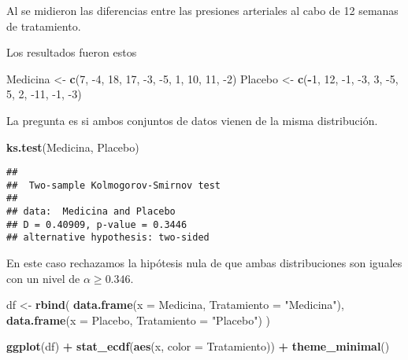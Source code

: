 \documentclass[
  12pt,
]{book}
\newenvironment{Shaded}{\begin{snugshade}}{\end{snugshade}}
\newcommand{\DataTypeTok}[1]{\textcolor[rgb]{0.13,0.29,0.53}{#1}}
\newcommand{\DecValTok}[1]{\textcolor[rgb]{0.00,0.00,0.81}{#1}}
\newcommand{\KeywordTok}[1]{\textcolor[rgb]{0.13,0.29,0.53}{\textbf{#1}}}
\newcommand{\NormalTok}[1]{#1}
\newcommand{\OperatorTok}[1]{\textcolor[rgb]{0.81,0.36,0.00}{\textbf{#1}}}
\newcommand{\StringTok}[1]{\textcolor[rgb]{0.31,0.60,0.02}{#1}}
\begin{document}
Al se midieron las diferencias entre las presiones arteriales al cabo de 12
semanas de tratamiento.

Los resultados fueron estos

\begin{Shaded}
\begin{Highlighting}[]
\NormalTok{Medicina \textless{}{-}}\StringTok{ }\KeywordTok{c}\NormalTok{(}\DecValTok{7}\NormalTok{, }\DecValTok{{-}4}\NormalTok{, }\DecValTok{18}\NormalTok{, }\DecValTok{17}\NormalTok{, }\DecValTok{{-}3}\NormalTok{, }\DecValTok{{-}5}\NormalTok{, }\DecValTok{1}\NormalTok{, }\DecValTok{10}\NormalTok{, }\DecValTok{11}\NormalTok{, }\DecValTok{{-}2}\NormalTok{)}
\NormalTok{Placebo \textless{}{-}}\StringTok{ }\KeywordTok{c}\NormalTok{(}\OperatorTok{{-}}\DecValTok{1}\NormalTok{, }\DecValTok{12}\NormalTok{, }\DecValTok{{-}1}\NormalTok{, }\DecValTok{{-}3}\NormalTok{, }\DecValTok{3}\NormalTok{, }\DecValTok{{-}5}\NormalTok{, }\DecValTok{5}\NormalTok{, }\DecValTok{2}\NormalTok{, }\DecValTok{{-}11}\NormalTok{, }\DecValTok{{-}1}\NormalTok{, }\DecValTok{{-}3}\NormalTok{)}
\end{Highlighting}
\end{Shaded}

La pregunta es si ambos conjuntos de datos vienen de la misma distribución.

\begin{Shaded}
\begin{Highlighting}[]
\KeywordTok{ks.test}\NormalTok{(Medicina, Placebo)}
\end{Highlighting}
\end{Shaded}

\begin{verbatim}
## 
##  Two-sample Kolmogorov-Smirnov test
## 
## data:  Medicina and Placebo
## D = 0.40909, p-value = 0.3446
## alternative hypothesis: two-sided
\end{verbatim}

En este caso rechazamos la hipótesis nula de que ambas distribuciones son
iguales con un nivel de \(\alpha \geq 0.346\).

\begin{Shaded}
\begin{Highlighting}[]
\NormalTok{df \textless{}{-}}\StringTok{ }\KeywordTok{rbind}\NormalTok{(}
  \KeywordTok{data.frame}\NormalTok{(}\DataTypeTok{x =}\NormalTok{ Medicina, }\DataTypeTok{Tratamiento =} \StringTok{"Medicina"}\NormalTok{),}
  \KeywordTok{data.frame}\NormalTok{(}\DataTypeTok{x =}\NormalTok{ Placebo, }\DataTypeTok{Tratamiento =} \StringTok{"Placebo"}\NormalTok{)}
\NormalTok{)}

\KeywordTok{ggplot}\NormalTok{(df) }\OperatorTok{+}
\StringTok{  }\KeywordTok{stat\_ecdf}\NormalTok{(}\KeywordTok{aes}\NormalTok{(x, }\DataTypeTok{color =}\NormalTok{ Tratamiento)) }\OperatorTok{+}
\StringTok{  }\KeywordTok{theme\_minimal}\NormalTok{()}
\end{Highlighting}
\end{Shaded}
\end{document}
